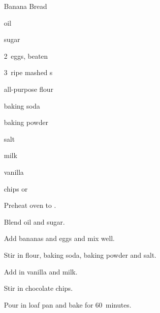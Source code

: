 \begin{recipe}{Banana Bread}{}{}

\begin{ingredients}
\item \C{\half} oil
\item {} sugar
\item 2~eggs, beaten
\item 3~ripe mashed s
\item {} all-purpose flour
\item {} baking soda
\item \tp{\half} baking powder
\item \tp{\half} salt
\item {} milk
\item \tp{\half} vanilla
\item {}  chips or 
\end{ingredients}

\begin{directions}
\item Preheat oven to .
\item Blend oil and sugar.
\item Add bananas and eggs and mix well.
\item Stir in flour, baking soda, baking powder and salt.
\item Add in vanilla and milk.
\item Stir in chocolate chips.
\item Pour in loaf pan and bake for 60~minutes.
\end{directions}

\end{recipe}
